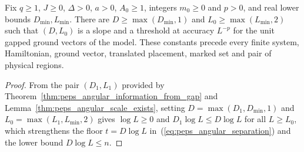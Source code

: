 \begin{lemma}
    \label{thm:peps_angular_scale_lower_bounds}
    \leanok
    Fix $q\ge1$, $J\ge0$, $\Delta>0$, $a>0$, $A_0\ge1$, integers
    $m_0\ge0$ and $p>0$, and real lower bounds $D_{\min},L_{\min}$.
    There are $D\ge\max(D_{\min},1)$ and
    $L_0\ge\max(L_{\min},2)$ such that $(D,L_0)$ is a slope and a
    threshold at accuracy $L^{-p}$ for the unit gapped ground vectors of the
    model. These constants precede every finite
    system, Hamiltonian, ground vector, translated placement, marked set
    and pair of physical regions.
\end{lemma}
\begin{proof}
    \leanok
    From the pair $(D_1,L_1)$ provided by Theorem~\ref{thm:peps_angular_information_from_gap} and Lemma~\ref{thm:peps_angular_scale_exists},
    setting $D=\max(D_1,D_{\min},1)$ and
    $L_0=\max(L_1,L_{\min},2)$ gives $\log L\ge0$ and
    $D_1\log L\le D\log L$ for all $L\ge L_0$, which strengthens the floor $t=D\log L$ in~(\ref{eq:peps_angular_separation}) and the lower bound $D\log L\le n$.
\end{proof}


